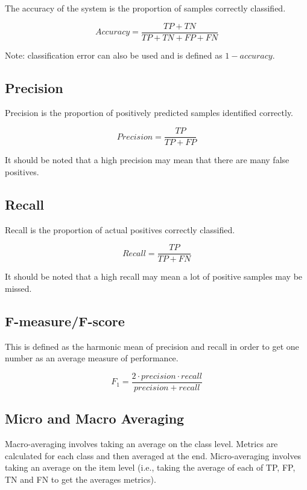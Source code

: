 The accuracy of the system is the proportion of samples correctly classified.

$$ Accuracy = \frac{TP + TN}{TP + TN + FP + FN} $$

Note: classification error can also be used and is defined as $ 1 - accuracy $.

\subsection{Precision}

Precision is the proportion of positively predicted samples identified correctly.

$$ Precision = \frac{TP}{TP + FP} $$

It should be noted that a high precision may mean that there are many false positives.

\subsection{Recall}

Recall is the proportion of actual positives correctly classified.

$$ Recall = \frac{TP}{TP + FN} $$

It should be noted that a high recall may mean a lot of positive samples may be missed.

\subsection{F-measure/F-score}

This is defined as the harmonic mean of precision and recall in order to get one number as an average measure of performance.

$$ F_1 = \frac{2 \cdot precision \cdot recall}{precision + recall} $$

\subsection{Micro and Macro Averaging} \label{ssec:eval_metric_averaging}

Macro-averaging involves taking an average on the class level. Metrics are calculated for each class and then averaged at the end. Micro-averaging involves taking an average on the item level (i.e., taking the average of each of TP, FP, TN and FN to get the averages metrics).